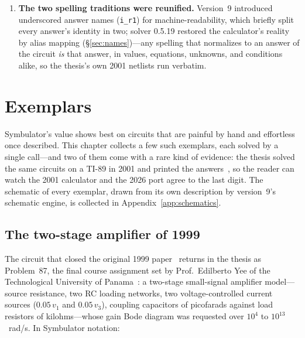 \documentclass[11pt,oneside]{report}
\newcommand{\code}[1]{\texttt{#1}}
\begin{document}
\begin{enumerate}
  parameter block named one node per port and grounded the other
  terminal implicitly; a circuit that did not fit had to be redrawn.
  Version~9 keeps that form and adds the bracketed pair
  (\S\ref{sec:fourterminal}), which cost one stamping change and two
  consequences elsewhere---a current answer per live terminal, and a
  connectivity check that admits a side of the circuit with no path to
  ground and gives it a reference of its own.
\item \textbf{The two spelling traditions were reunified.} Version~9
  introduced underscored answer names (\code{i\_r1}) for
  machine-readability, which briefly split every answer's identity in
  two; solver 0.5.19 restored the calculator's reality by alias
  mapping (\S\ref{sec:names})---any spelling that normalizes to an
  answer of the circuit \emph{is} that answer, in values, equations,
  unknowns, and conditions alike, so the thesis's own 2001 netlists
  run verbatim.
\end{enumerate}

\chapter{Exemplars}
\label{ch:exemplars}

Symbulator's value shows best on circuits that are painful by hand and
effortless once described. This chapter collects a few such exemplars,
each solved by a single call---and two of them come with a rare kind
of evidence: the thesis solved the same circuits on a TI-89 in 2001
and printed the answers~\cite{thesis2000}, so the reader can watch
the 2001 calculator and the 2026 port agree to the last digit. The
schematic of every exemplar, drawn from its own description by
version~9's schematic engine, is collected in
Appendix~\ref{app:schematics}.

\section{The two-stage amplifier of 1999}
\label{sec:amplifier}

The circuit that closed the original 1999 paper~\cite{paper1999}
returns in the thesis as Problem~87, the final course assignment set
by Prof.\ Edilberto Yee of the Technological University of
Panama~\cite[\S12.2]{thesis2000}: a two-stage small-signal amplifier
model---source resistance, two RC loading networks, two
voltage-controlled current sources ($0.05\,v_1$ and $0.05\,v_3$),
coupling capacitors of picofarads against load resistors of
kilohms---whose gain Bode diagram was requested over $10^{4}$ to
$10^{13}$~rad/s. In Symbulator notation:
\end{document}
